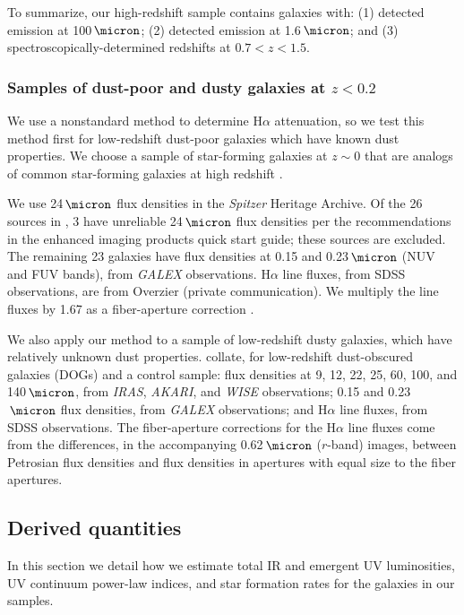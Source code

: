 \documentclass[preprint]{aastex}
\begin{document}
To summarize, our high-redshift sample contains galaxies with: (1) detected
emission at 100$\,\micron$; (2) detected emission at 1.6$\,\micron$; and (3)
spectroscopically-determined redshifts at $0.7 < z < 1.5$.

\subsubsection{Samples of dust-poor and dusty galaxies at $z < 0.2$}

We use a nonstandard method to determine H$\alpha$ attenuation, so we test this
method first for low-redshift dust-poor galaxies which have known dust
properties.  We choose a sample of star-forming galaxies at $z \sim 0$ that are
analogs of common star-forming galaxies at high redshift
\citep[LBAs;][]{overzier09,overzier11}.

We use 24$\,\micron$ flux densities in the \emph{Spitzer} Heritage Archive.  Of
the 26 sources in \citet{overzier11}, 3 have unreliable 24$\,\micron$ flux
densities per the recommendations in the enhanced imaging products quick start
guide; these sources are excluded.  The remaining 23 galaxies have flux
densities at
0.15 and 0.23$\,\micron$ (NUV and FUV bands), from \emph{GALEX} observations.
H$\alpha$ line
fluxes, from SDSS observations, are from Overzier (private communication).  We
multiply the line fluxes by 1.67 as a fiber-aperture correction
\citep{overzier09}.

We also apply our method to a sample of low-redshift dusty galaxies, which have
relatively unknown dust properties.  \citet{hwang13} collate, for low-redshift
dust-obscured galaxies (DOGs) and a control sample: flux densities at
9, 12, 22, 25, 60, 100, and 140$\,\micron$, from \emph{IRAS}, \emph{AKARI}, and
\emph{WISE} observations; 0.15 and 0.23$\,\micron$ flux densities, from
\emph{GALEX} observations; and H$\alpha$ line fluxes, from SDSS observations.
The fiber-aperture corrections for the H$\alpha$ line fluxes come from the
differences, in the accompanying 0.62$\,\micron$ ($r$-band) images, between
Petrosian flux
densities and flux densities in apertures with equal size to the fiber
apertures.

\subsection{Derived quantities}

In this section we detail how we estimate total IR and emergent UV
luminosities, UV continuum power-law indices, and star formation rates for the
galaxies in our samples.
\end{document}
